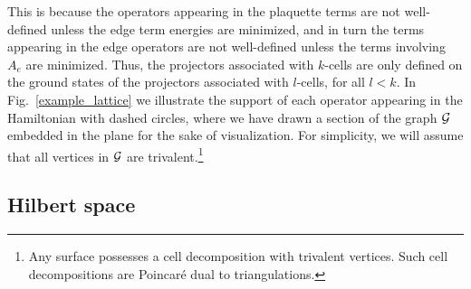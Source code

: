 This is because the operators appearing in the plaquette terms are not well-defined unless the edge term energies are minimized, and in turn the terms appearing in the edge operators are not well-defined unless the terms involving $A_e$ are minimized.
Thus, the projectors associated with $k$-cells are only defined on the ground states of the projectors associated with $l$-cells, for all $l<k$.  
In Fig.~\ref{example_lattice} we illustrate the support of each operator appearing in the Hamiltonian with dashed circles, where we have drawn a section of the graph $\mathcal{G}$ embedded in the plane for the sake of visualization. 
For simplicity, we will assume that all vertices in $\mathcal{G}$ are trivalent.\footnote{
Any surface possesses a cell decomposition with trivalent vertices.
Such cell decompositions are Poincar\'e dual to triangulations.}




\subsection{Hilbert space} \label{hilbertspacesect}

